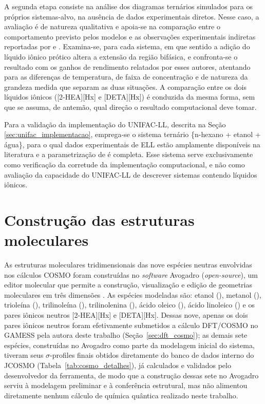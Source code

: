 A segunda etapa consiste na análise dos diagramas ternários simulados para os próprios sistemas-alvo, na ausência de dados experimentais diretos. Nesse caso, a avaliação é de natureza qualitativa e apoia-se na comparação entre o comportamento previsto pelos modelos e as observações experimentais indiretas reportadas por  e . Examina-se, para cada sistema, em que sentido a adição do líquido iônico prótico altera a extensão da região bifásica, e confronta-se o resultado com os ganhos de rendimento relatados por esses autores, atentando para as diferenças de temperatura, de faixa de concentração e de natureza da grandeza medida que separam as duas situações. A comparação entre os dois líquidos iônicos ([2-HEA][Hx] e [DETA][Hx]) é conduzida da mesma forma, sem que se assuma, de antemão, qual direção o resultado computacional deve tomar.

Para a validação da implementação do UNIFAC-LL, descrita na Seção \ref{sec:unifac_implementacao}, emprega-se o sistema ternário \{n-hexano + etanol + água\}, para o qual dados experimentais de ELL estão amplamente disponíveis na literatura e a parametrização de  é completa. Esse sistema serve exclusivamente como verificação da corretude da implementação computacional, e não como avaliação da capacidade do UNIFAC-LL de descrever sistemas contendo líquidos iônicos.

\section{Construção das estruturas moleculares}
\label{sec:estruturas}

As estruturas moleculares tridimensionais das nove espécies neutras envolvidas nos cálculos COSMO foram construídas no \textit{software} Avogadro (\textit{open-source}), um editor molecular que permite a construção, visualização e edição de geometrias moleculares em três dimensões \cite{avogadro2012}. As espécies modeladas são: etanol (), metanol (), trioleína (), trilinoleína (), trilinolenina (), ácido oleico (), ácido linoleico () e os pares iônicos neutros [2-HEA][Hx] e [DETA][Hx]. Dessas nove, apenas os dois pares iônicos neutros foram efetivamente submetidos a cálculo DFT/COSMO no GAMESS pela autora deste trabalho (Seção~\ref{sec:dft_cosmo}); as demais sete espécies, construídas no Avogadro como parte da modelagem inicial do sistema, tiveram seus $\sigma$-profiles finais obtidos diretamente do banco de dados interno do JCOSMO (Tabela~\ref{tab:cosmo_detalhes}), já calculados e validados pelo desenvolvedor da ferramenta, de modo que a construção dessas sete no Avogadro serviu à modelagem preliminar e à conferência estrutural, mas não alimentou diretamente nenhum cálculo de química quântica realizado neste trabalho.

